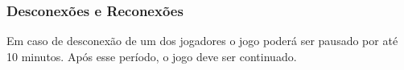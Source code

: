 \subsubsection{Desconexões e Reconexões}

Em caso de desconexão de um dos jogadores o jogo poderá ser pausado por até 10 minutos. Após esse período, o jogo deve ser continuado.
